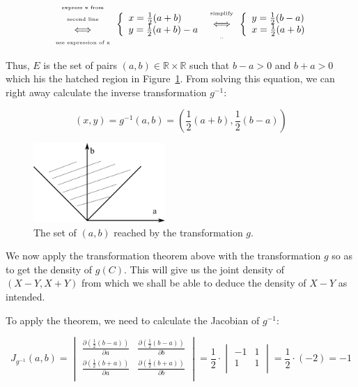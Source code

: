 \documentclass{article}
\newcommand\R{{\mathbb R} }
\begin{document}
$$
\begin{array}{c}\mbox{\tiny express x from}\\\mbox{\tiny second line}\\\Longleftrightarrow\\\mbox{\tiny use expression of x}\end{array}
\left\{\begin{array}{l} x = \frac{1}{2}(a+b)\\y=\frac{1}{2}(a+b)-a\end{array}\right. 
\begin{array}{c}\mbox{\tiny simplify}\\\Longleftrightarrow\\\mbox{\tiny ..}\end{array}
\left\{\begin{array}{l} y=\frac{1}{2}(b-a)\\ x = \frac{1}{2}(a+b)\end{array}\right. 
$$

Thus, $E$ is the set of pairs $(a,b)\in\R\times\R$  such that $b-a>0$ and $b+a>0$ which his the hatched region in Figure~\ref{fig:TransfoDomain}. From solving this equation, we can right away calculate the inverse transformation $g^{-1}$:

$$(x,y) = g^{-1}(a,b) = \left( \frac{1}{2}(a+b), \frac{1}{2}(b-a) \right)$$

\begin{figure}\begin{center}
\includegraphics[width=5cm]{transformation-domain}\end{center}
\caption{The set of $(a,b)$ reached by the transformation $g$.}\label{fig:TransfoDomain}
\end{figure}

We now apply the transformation theorem above with the transformation $g$ so as to get the density of $g(C)$. This will give us the joint density of $(X-Y,X+Y)$ from which we shall be able to deduce the density of $X-Y$ as intended. 

To apply the theorem, we need to calculate the Jacobian of $g^{-1}$: 

\renewcommand\arraystretch{2}
$$J_{g^{-1}}(a,b) = \begin{vmatrix}
\frac{\partial(\frac{1}{2}(b-a))}{\partial a}       & \frac{\partial(\frac{1}{2}(b-a))}{\partial b}\\
\frac{\partial(\frac{1}{2}(b+a))}{\partial a}       & \frac{\partial(\frac{1}{2}(b+a))}{\partial b}\\
\end{vmatrix} 
= 
\frac{1}{2}\cdot \begin{vmatrix}
-1       & 1 \\
1       & 1\\
\end{vmatrix} = \frac{1}{2}\cdot(-2) = -1$$
\end{document}

